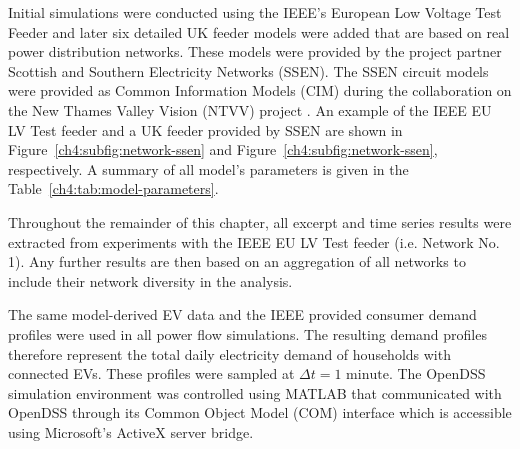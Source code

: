 

Initial simulations were conducted using the IEEE's European Low Voltage Test Feeder \cite{EULVFeeder2015} and later six detailed UK feeder models were added that are based on real power distribution networks.
These models were provided by the project partner Scottish and Southern Electricity Networks (SSEN).
The SSEN circuit models were provided as Common Information Models (CIM) during the collaboration on the New Thames Valley Vision (NTVV) project \cite{NTVV2016}.
An example of the IEEE EU LV Test feeder and a UK feeder provided by SSEN are shown in Figure~\ref{ch4:subfig:network-ssen} and Figure~\ref{ch4:subfig:network-ssen}, respectively.
A summary of all model's parameters is given in the Table~\ref{ch4:tab:model-parameters}.



Throughout the remainder of this chapter, all excerpt and time series results were extracted from experiments with the IEEE EU LV Test feeder (i.e. Network No. 1).
Any further results are then based on an aggregation of all networks to include their network diversity in the analysis.

The same model-derived EV data and the IEEE provided consumer demand profiles were used in all power flow simulations.
The resulting demand profiles therefore represent the total daily electricity demand of households with connected EVs.
These profiles were sampled at $\Delta t = 1\text{ minute}$.
The OpenDSS simulation environment was controlled using MATLAB that communicated with OpenDSS through its Common Object Model (COM) interface which is accessible using Microsoft's ActiveX server bridge.
